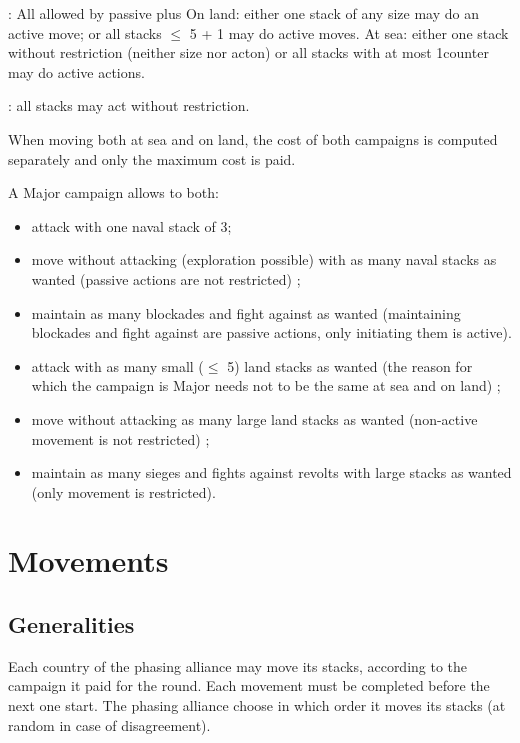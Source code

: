 \ducats: All allowed by passive plus
\bparag On land: either one stack of any size may do an active move;
or all stacks $\leq$ 5 \LD + 1 \Pasha may do active moves.
\bparag At sea: either one stack without restriction (neither size nor acton)
or all stacks with at most 1\FLEET counter may do active actions.

\ducats: all stacks may act without restriction.

\aparag When moving both at sea and on land, the cost of both campaigns is
computed separately and only the maximum cost is paid.

\begin{exemple}
  A Major campaign allows to both:
  \begin{itemize}
  \item attack with one naval stack of 3\FLEET ;
  \item move without attacking (exploration possible) with as many naval
    stacks as wanted (passive actions are not restricted) ;
  \item maintain as many blockades and fight against \corsaire as wanted
    (maintaining blockades and fight against \corsaire are passive actions,
    only initiating them is active).
  \item attack with as many small ($\leq$ 5\LD) land stacks as wanted (the
    reason for which the campaign is Major needs not to be the same at sea and
    on land) ;
  \item move without attacking as many large land stacks as wanted
    (non-active movement is not restricted) ;
  \item maintain as many sieges and fights against revolts with large stacks as
    wanted (only movement is restricted).
  \end{itemize}
\end{exemple}

\section{Movements}
\label{chMilitary:Movements}
\subsection{Generalities}
Each country of the phasing alliance may move its stacks, according to the
campaign it paid for the round. Each movement must be completed before the
next one start. The phasing alliance choose in which order it moves its stacks
(at random in case of disagreement).

